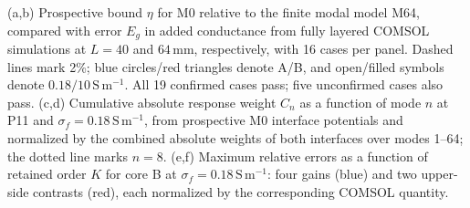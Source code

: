 (a,b) Prospective bound $\eta$ for M0 relative to the finite modal model M64, compared with error $E_g$ in added conductance from fully layered COMSOL simulations at $L=40$ and $64\,\mathrm{mm}$, respectively, with 16 cases per panel. Dashed lines mark 2\%; blue circles/red triangles denote A/B, and open/filled symbols denote $0.18/10\,\mathrm{S\,m^{-1}}$. All 19 confirmed cases pass; five unconfirmed cases also pass. (c,d) Cumulative absolute response weight $C_n$ as a function of mode $n$ at P11 and $\sigma_f=0.18\,\mathrm{S\,m^{-1}}$, from prospective M0 interface potentials and normalized by the combined absolute weights of both interfaces over modes 1--64; the dotted line marks $n=8$. (e,f) Maximum relative errors as a function of retained order $K$ for core B at $\sigma_f=0.18\,\mathrm{S\,m^{-1}}$: four gains (blue) and two upper-side contrasts (red), each normalized by the corresponding COMSOL quantity.
